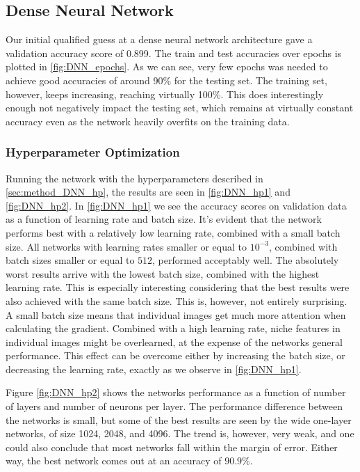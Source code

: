 \documentclass[10pt, twocolumn]{article}
\begin{document}
\subsection{Dense Neural Network}
Our initial qualified guess at a dense neural network architecture gave a validation accuracy score of 0.899. The train and test accuracies over epochs is plotted in \cref{fig:DNN_epochs}. As we can see, very few epochs was needed to achieve good accuracies of around 90\% for the testing set. The training set, however, keeps increasing, reaching virtually 100\%. This does interestingly enough not negatively impact the testing set, which remains at virtually constant accuracy even as the network heavily overfits on the training data.


\subsubsection{Hyperparameter Optimization}
Running the network with the hyperparameters described in \cref{sec:method_DNN_hp}, the results are seen in \cref{fig:DNN_hp1} and \cref{fig:DNN_hp2}. In \cref{fig:DNN_hp1} we see the accuracy scores on validation data as a function of learning rate and batch size. It's evident that the network performs best with a relatively low learning rate, combined with a small batch size. All networks with learning rates smaller or equal to $10^{-3}$, combined with batch sizes smaller or equal to $512$, performed acceptably well. The absolutely worst results arrive with the lowest batch size, combined with the highest learning rate. This is especially interesting considering that the best results were also achieved with the same batch size. This is, however, not entirely surprising. A small batch size means that individual images get much more attention when calculating the gradient. Combined with a high learning rate, niche features in individual images might be overlearned, at the expense of the networks general performance. This effect can be overcome either by increasing the batch size, or decreasing the learning rate, exactly as we observe in \cref{fig:DNN_hp1}.

Figure \cref{fig:DNN_hp2} shows the networks performance as a function of number of layers and number of neurons per layer. The performance difference between the networks is small, but some of the best results are seen by the wide one-layer networks, of size 1024, 2048, and 4096. The trend is, however, very weak, and one could also conclude that most networks fall within the margin of error. Either way, the best network comes out at an accuracy of $90.9\%$.
\end{document}
